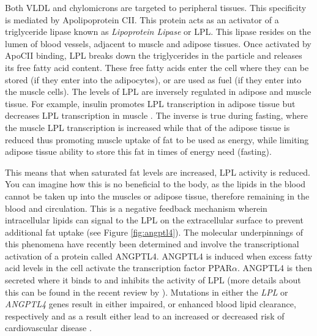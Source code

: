 \documentclass{tufte-handout}
\begin{document}
Both VLDL and chylomicrons are targeted to peripheral tissues.  This specificity is mediated by Apolipoprotein CII.  This protein acts as an activator of a triglyceride lipase known as \emph{Lipoprotein Lipase} or LPL.  This lipase resides on the lumen of blood vessels, adjacent to muscle and adipose tissues.  Once activated by ApoCII binding, LPL breaks down the triglycerides in the particle and releases its free fatty acid content.  These free fatty acids enter the cell where they can be stored (if they enter into the adipocytes), or are used as fuel (if they enter into the muscle cells).  The levels of LPL are inversely regulated in adipose and muscle tissue. For example, insulin promotes LPL transcription in adipose tissue but decreases LPL transcription in muscle \citep{Spooners1979}.  The inverse is true during fasting, where the muscle LPL transcription is increased while that of the adipose tissue is reduced thus promoting muscle uptake of fat to be used as energy, while limiting adipose tissue ability to store this fat in times of energy need (fasting). 

  This means that when saturated fat levels are increased, LPL activity is reduced. You can imagine how this is no beneficial to the body, as the lipids in the blood cannot be taken up into the muscles or adipose tissue, therefore remaining in the blood and circulation.  This is a negative feedback mechanism wherein intracellular lipids can signal to the LPL on the extracellular surface to prevent additional fat uptake (see Figure \ref{fig:angptl4}).  The molecular underpinnings of this phenomena have recently been determined and involve the transcriptional activation of a protein called ANGPTL4.  ANGPTL4 is induced when excess fatty acid levels in the cell activate the transcription factor PPAR$\alpha$.  ANGPTL4 is then secreted where it binds to and inhibits the activity of LPL (more details about this can be found in the recent review by \citet{Dijk2014}).  Mutations in either the \textit{LPL} or \textit{ANGPTL4} genes result in either impaired, or enhanced blood lipid clearance, respectively and as a result either lead to an increased or decreased risk of cardiovascular disease \citep{Article2016b}.
\end{document}
